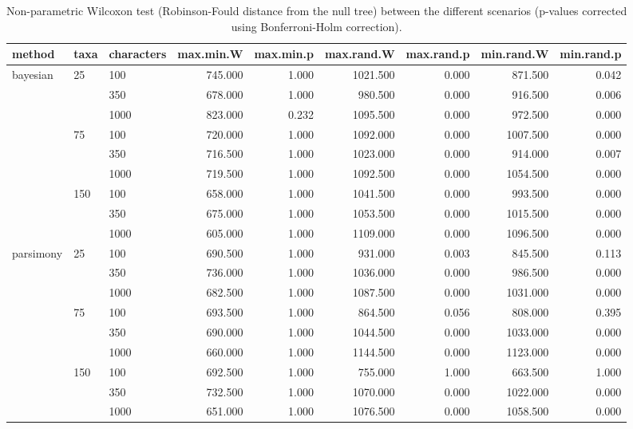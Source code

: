 \begin{table}[ht]
\centering
\begin{tabular}{lllrrrrrr}
  \hline
method & taxa & characters & max.min.W & max.min.p & max.rand.W & max.rand.p & min.rand.W & min.rand.p \\ 
  \hline
bayesian & 25 & 100 & 745.000 & 1.000 & 1021.500 & 0.000 & 871.500 & 0.042 \\ 
   &  & 350 & 678.000 & 1.000 & 980.500 & 0.000 & 916.500 & 0.006 \\ 
   &  & 1000 & 823.000 & 0.232 & 1095.500 & 0.000 & 972.500 & 0.000 \\ 
   & 75 & 100 & 720.000 & 1.000 & 1092.000 & 0.000 & 1007.500 & 0.000 \\ 
   &  & 350 & 716.500 & 1.000 & 1023.000 & 0.000 & 914.000 & 0.007 \\ 
   &  & 1000 & 719.500 & 1.000 & 1092.500 & 0.000 & 1054.500 & 0.000 \\ 
   & 150 & 100 & 658.000 & 1.000 & 1041.500 & 0.000 & 993.500 & 0.000 \\ 
   &  & 350 & 675.000 & 1.000 & 1053.500 & 0.000 & 1015.500 & 0.000 \\ 
   &  & 1000 & 605.000 & 1.000 & 1109.000 & 0.000 & 1096.500 & 0.000 \\ 
  parsimony & 25 & 100 & 690.500 & 1.000 & 931.000 & 0.003 & 845.500 & 0.113 \\ 
   &  & 350 & 736.000 & 1.000 & 1036.000 & 0.000 & 986.500 & 0.000 \\ 
   &  & 1000 & 682.500 & 1.000 & 1087.500 & 0.000 & 1031.000 & 0.000 \\ 
   & 75 & 100 & 693.500 & 1.000 & 864.500 & 0.056 & 808.000 & 0.395 \\ 
   &  & 350 & 690.000 & 1.000 & 1044.500 & 0.000 & 1033.000 & 0.000 \\ 
   &  & 1000 & 660.000 & 1.000 & 1144.500 & 0.000 & 1123.000 & 0.000 \\ 
   & 150 & 100 & 692.500 & 1.000 & 755.000 & 1.000 & 663.500 & 1.000 \\ 
   &  & 350 & 732.500 & 1.000 & 1070.000 & 0.000 & 1022.000 & 0.000 \\ 
   &  & 1000 & 651.000 & 1.000 & 1076.500 & 0.000 & 1058.500 & 0.000 \\ 
   \hline
\end{tabular}
\caption{Non-parametric Wilcoxon test (Robinson-Fould distance from the null tree) between the different scenarios (p-values corrected using Bonferroni-Holm correction).} 
\label{Full_Tab_BCRFnull}
\end{table}
